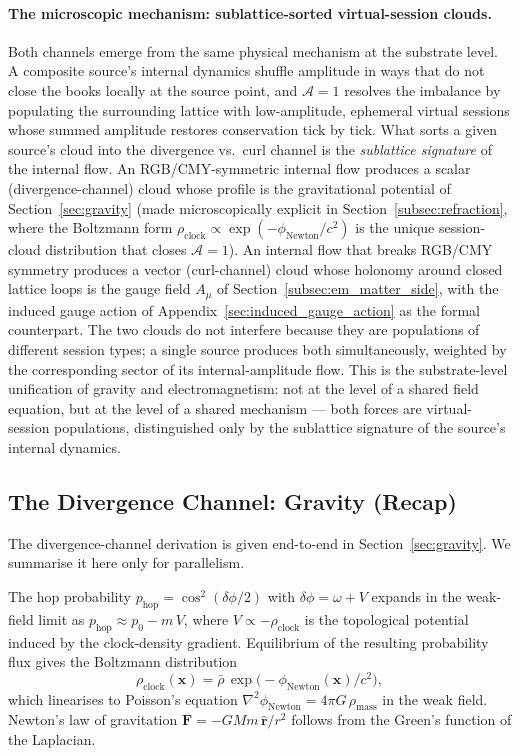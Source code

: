 \paragraph{The microscopic mechanism: sublattice-sorted virtual-session
clouds.}
Both channels emerge from the same physical mechanism at the
substrate level.  A composite source's internal dynamics shuffle
amplitude in ways that do not close the books locally at the source
point, and $\mathcal{A}=1$ resolves the imbalance by populating the
surrounding lattice with low-amplitude, ephemeral virtual sessions
whose summed amplitude restores conservation tick by tick.  What
sorts a given source's cloud into the divergence vs.\ curl channel
is the \emph{sublattice signature} of the internal flow.  An RGB/CMY-symmetric
internal flow produces a scalar (divergence-channel) cloud whose
profile is the gravitational potential of
Section~\ref{sec:gravity} (made microscopically explicit in
Section~\ref{subsec:refraction}, where the Boltzmann form
$\rho_\text{clock}\propto \exp(-\phi_\text{Newton}/c^2)$ is the
unique session-cloud distribution that closes $\mathcal{A}=1$).
An internal flow that breaks RGB/CMY symmetry produces a vector
(curl-channel) cloud whose holonomy around closed lattice loops is
the gauge field $A_\mu$ of Section~\ref{subsec:em_matter_side},
with the induced gauge action of
Appendix~\ref{sec:induced_gauge_action} as the formal counterpart.
The two clouds do not interfere because they are populations of
different session types; a single source produces both
simultaneously, weighted by the corresponding sector of its
internal-amplitude flow.  This is the substrate-level unification
of gravity and electromagnetism: not at the level of a shared
field equation, but at the level of a shared mechanism --- both
forces are virtual-session populations, distinguished only by the
sublattice signature of the source's internal dynamics.

\subsection{The Divergence Channel: Gravity (Recap)}
\label{subsec:gravity_recap}

The divergence-channel derivation is given end-to-end in
Section~\ref{sec:gravity}. We summarise it here only for parallelism.

The hop probability $p_\text{hop} = \cos^2(\delta\phi/2)$ with
$\delta\phi = \omega + V$ expands in the weak-field limit as
$p_\text{hop} \approx p_0 - m\,V$, where $V \propto -\rho_\text{clock}$
is the topological potential induced by the clock-density gradient.
Equilibrium of the resulting probability flux gives the Boltzmann
distribution
\begin{equation}
    \rho_\text{clock}(\mathbf{x}) = \bar\rho\,
    \exp\!\bigl(-\phi_\text{Newton}(\mathbf{x})/c^2\bigr),
    \label{eq:boltzmann_clock_recap}
\end{equation}
which linearises to Poisson's equation
$\nabla^2\phi_\text{Newton} = 4\pi G\,\rho_\text{mass}$ in the weak
field. Newton's law of gravitation
$\mathbf{F} = -GMm\,\hat{\mathbf{r}}/r^2$ follows from the Green's
function of the Laplacian.


